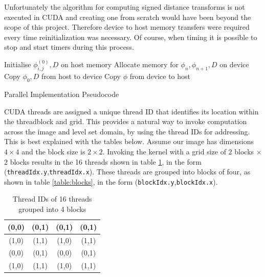 Unfortunately the algorithm for computing signed distance transforms is not executed in CUDA and creating one from scratch would have been beyond the scope of this project. Therefore device to host memory transfers were required every time reinitialization was necessary. Of course, when timing it is possible to stop and start timers during this process.

	
\begin{algorithm}[h]
\dontprintsemicolon
\BlankLine
\SetLine
Initialise $\phi_{i,j}^(0), D$ on host memory\;
Allocate memory for $\phi_n ,\phi_{n+1}, D$ on device\;
Copy $\phi_0 , D$ from host to device\;
Copy $\phi$ from device to host\;
\caption{Parallel Implementation Pseudocode}\label{alg:cuda1}
\end{algorithm}	

CUDA threads are assigned a unique thread ID that identifies its location within the threadblock and grid. This provides a natural way to invoke computation across the image and level set domain, by using the thread IDs for addressing.  This is best explained with the tables below. Assume our image has dimensions $4\times 4$ and the block size is $2 \times 2$. Invoking the kernel with a grid size of 2 blocks $\times$ 2 blocks results in the 16 threads shown in table \ref{table:threads}, in the form (\texttt{threadIdx.y},\texttt{threadIdx.x}). These threads are grouped into blocks of four, as shown in table \ref{table:blocks}, in the form (\texttt{blockIdx.y},\texttt{blockIdx.x}). 

\begin{table}
\begin{center}
  \begin{tabular}{ | c | c || c | c |}
    \hline
    (0,0) & (0,1) & (0,1) & (0,1) \\ \hline
    (1,0) & (1,1) & (1,0) & (1,1) \\ \hline\hline
    (0,0) & (0,1) & (0,0) & (0,1) \\ \hline
    (1,0) & (1,1) & (1,0) & (1,1) \\
    \hline
  \end{tabular}
\end{center}
\label{table:threads}\caption{Thread IDs of 16 threads grouped into 4 blocks}
\end{table}

